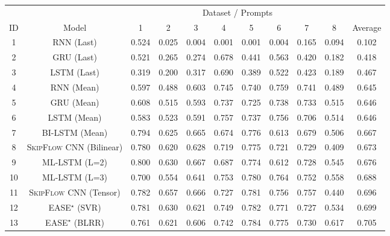 \documentclass[letterpaper]{article}
\begin{document}
\begin{table*}[ht]
   \centering
   \small
   \setlength{\extrarowheight}{1.2pt}
     \begin{tabular}{|c|c|cccccccc|c|}
     \hline

           & & \multicolumn{8}{c}{Dataset / Prompts}                       &  \\
           \cline{1-11}
     ID & Model & 1     & 2     & 3     & 4     & 5     & 6     & 7     & 8     & Average \\
     \hline
    
     1 & RNN (Last) & 0.524 & 0.025 & 0.004 & 0.001 & 0.001 & 0.004 & 0.165 & 0.094 & 0.102 \\
     2 & GRU (Last) & 0.521 & 0.265 & 0.274 & 0.678 & 0.441 & 0.563 & 0.420 & 0.182 & 0.418 \\
     3 & LSTM (Last) & 0.319 & 0.200   & 0.317 & 0.690  & 0.389 & 0.522 & 0.423 & 0.189 & 0.467 \\


     4 & RNN (Mean) & 0.597  &  0.488 &  0.603 &  0.745 &  0.740 &   0.759 &  0.741  & 0.489  & 0.645 \\
     5 & GRU (Mean) & 0.608 & 0.515 & 0.593 & 0.737 & 0.725 & 0.738 & 0.733 & 0.515 & 0.646 \\
     6 & LSTM (Mean) & 0.583 & 0.523 & 0.591 & 0.757 & 0.737 & 0.756 & 0.706 & 0.514 & 0.646 \\
     

     7 & BI-LSTM (Mean) & 0.794  & 0.625  & 0.665 &  0.674 &  0.776 &  0.613 &  0.679 &  0.506 &  0.667   \\
8 & \textsc{SkipFlow} CNN (Bilinear) & 0.780  &  0.620 &   0.628 &  0.719  & 0.775 &  0.721 &  0.729  & 0.409 &  0.673 \\
     9 &  ML-LSTM (L=2) & 0.800  &  0.630 &   0.667  & 0.687 &   0.774 &  0.612 &  0.728 &  0.545  & 0.676 \\
    10 &  ML-LSTM (L=3) & 0.700  &  0.554  & 0.641  & 0.753  &  0.780 &   0.764 &   0.752 &  0.558 &  0.688  \\   

     
     11 &  \textsc{SkipFlow} CNN (Tensor) &  0.782  &  0.657 &   0.666 &   0.727 &   0.781  &  0.756  &  0.757 &   0.440  &   0.696 \\
     12 & EASE$^{\star}$ (SVR) & 0.781 & 0.630  & 0.621 & 0.749 & 0.782 & 0.771 & 0.727 & 0.534 & 0.699 \\
     13 & EASE$^{\star}$ (BLRR) & 0.761 & 0.621 & 0.606 & 0.742 & 0.784 & 0.775 & 0.730  & 0.617 & 0.705 \\


\end{tabular}
\end{table*}
\end{document}
